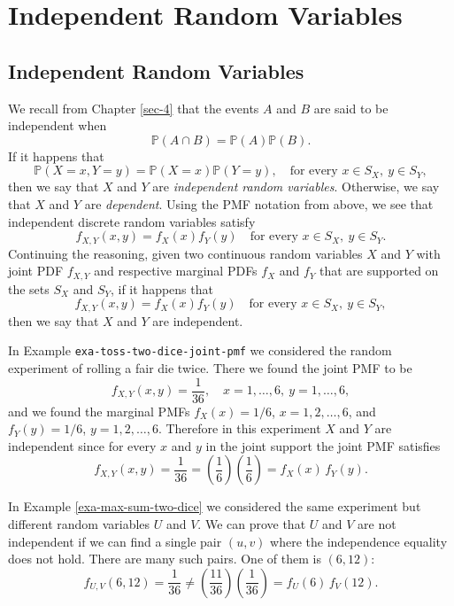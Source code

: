 \section{Independent Random Variables}
\label{sec-7-4}

\subsection{Independent Random Variables}
\label{sec-7-4-1}

We recall from Chapter \ref{sec-4} that the events \(A\) and \(B\) are
said to be independent when
\begin{equation}
\mathbb{P}(A\cap B)=\mathbb{P}(A)\mathbb{P}(B).
\end{equation}
If it happens that
\begin{equation}
\mathbb{P}(X=x,Y=y)=\mathbb{P}(X=x)\mathbb{P}(Y=y),\quad \mbox{for every }x\in S_{X},\ y\in S_{Y},
\end{equation}
then we say that \(X\) and \(Y\) are \emph{independent random
variables}. Otherwise, we say that \(X\) and \(Y\) are
\emph{dependent}. Using the PMF notation from above, we see that
independent discrete random variables satisfy
\begin{equation}
f_{X,Y}(x,y)=f_{X}(x)f_{Y}(y)\quad \mbox{for every }x\in S_{X},\ y\in S_{Y}.
\end{equation}
Continuing the reasoning, given two continuous random variables \(X\)
and \(Y\) with joint PDF \(f_{X,Y}\) and respective marginal PDFs
\(f_{X}\) and \(f_{Y}\) that are supported on the sets \(S_{X}\) and
\(S_{Y}\), if it happens that
\begin{equation}
f_{X,Y}(x,y)=f_{X}(x)f_{Y}(y)\quad \mbox{for every }x\in S_{X},\ y\in S_{Y},
\end{equation}
then we say that \(X\) and \(Y\) are independent.


In Example \texttt{exa-toss-two-dice-joint-pmf} we considered the random experiment of
rolling a fair die twice. There we found the joint PMF to be \[
f_{X,Y}(x,y)=\frac{1}{36},\quad x=1,\ldots,6,\ y=1,\ldots,6, \] and we
found the marginal PMFs \(f_{X}(x)=1/6\), \(x=1,2,\ldots,6\), and
\(f_{Y}(y)=1/6\), \(y=1,2,\ldots,6\). Therefore in this experiment
\(X\) and \(Y\) are independent since for every \(x\) and \(y\) in the
joint support the joint PMF satisfies \[
f_{X,Y}(x,y)=\frac{1}{36}=\left(\frac{1}{6}\right)\left(\frac{1}{6}\right)=f_{X}(x)\,
f_{Y}(y). \]



In Example \ref{exa-max-sum-two-dice} we considered the same experiment but
different random variables \(U\) and \(V\). We can prove that \(U\)
and \(V\) are not independent if we can find a single pair \((u,v)\)
where the independence equality does not hold. There are many such
pairs. One of them is \((6,12)\): \[
f_{U,V}(6,12)=\frac{1}{36}\neq\left(\frac{11}{36}\right)\left(\frac{1}{36}\right)=f_{U}(6)\,
f_{V}(12).  \]


